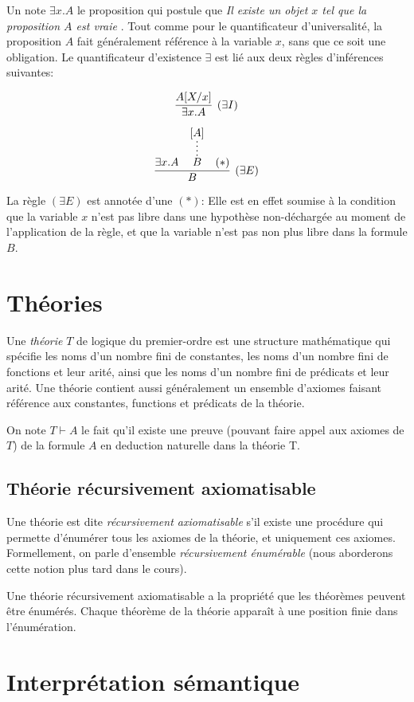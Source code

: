 Un note $\exists x. A$ le proposition qui postule que \og \textit{Il existe un objet $x$ tel que la proposition $A$ est vraie} \fg{}.
Tout comme pour le quantificateur d'universalité, la proposition $A$ fait généralement référence à la variable $x$, sans que ce soit une obligation.
Le quantificateur d'existence $\exists$ est lié aux deux règles d'inférences suivantes:

\[
\infer[({\exists}I)]{\exists x. A}{A[X / x]}
\]

\[
\infer[({\exists}E)]{B}{\exists x. A & \infer*{B}{[A]} & (*)}
\]

La règle $({\exists}E)$ est annotée d'une $(*)$: Elle est en effet soumise à la condition que la variable $x$ n'est pas libre dans une hypothèse non-déchargée au moment de l'application de la règle, et que la variable n'est pas non plus libre dans la formule $B$.

\section{Théories}

Une \og \textit{théorie} \fg{} $T$ de logique du premier-ordre est une structure mathématique qui spécifie les noms d'un nombre fini de constantes, les noms d'un nombre fini de fonctions et leur arité, ainsi que les noms d'un nombre fini de prédicats et leur arité.
Une théorie contient aussi généralement un ensemble d'axiomes faisant référence aux constantes, functions et prédicats de la théorie.

On note $T \vdash A$ le fait qu'il existe une preuve (pouvant faire appel aux axiomes de $T$) de la formule $A$ en deduction naturelle dans la théorie T.

\subsection{Théorie récursivement axiomatisable}

Une théorie est dite \og \textit{récursivement axiomatisable} \fg{} s'il existe une procédure qui permette d'énumérer tous les axiomes de la théorie, et uniquement ces axiomes. Formellement, on parle d'ensemble \textit{récursivement énumérable} (nous aborderons cette notion plus tard dans le cours).

Une théorie récursivement axiomatisable a la propriété que les théorèmes peuvent être énumérés.
Chaque théorème de la théorie apparaît à une position finie dans l'énumération.

\section{Interprétation sémantique}


